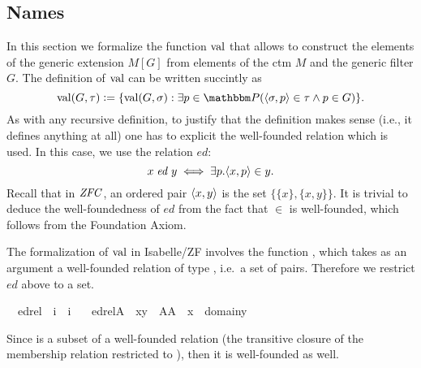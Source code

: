 \subsection{Names}
\label{sec:names}
In this section we formalize the function $\operatorname{val}$ that allows to
construct the elements of the generic extension $M[G]$ from elements
of the ctm $M$ and the generic filter $G$. The definition of $\operatorname{val}$
can be written succintly as
%
\begin{equation}\label{eq:def-val}
\val(G,\tau)\defi \{\val(G,\sigma) : \exists p\in \PP
(\lb\sigma,p\rb\in\tau \y p\in G)\}.
\end{equation}
%
As with any recursive definition, to justify that the definition makes
sense (i.e., it defines anything at all) one has to explicit the
well-founded relation which is used. In this case, we use the relation
$\mathit{ed}$:
\[
x \mathrel{\mathit{ed}} y \iff \exists p . \langle x,p\rangle\in y.
\]
Recall that in $\mathit{ZFC}$, an ordered pair $\langle x,y \rangle$ is the set
$\{\{x\},\{x,y\}\}$. It is trivial to deduce the well-foundedness of
$\mathit{ed}$ from the fact that $\in$ is well-founded, which follows
from the Foundation Axiom.

The  formalization of $\operatorname{val}$ in Isabelle/ZF involves the function
, which takes as an argument a well-founded relation of
type , i.e.\ a set of pairs. Therefore we restrict
$\mathit{ed}$ above to a set.
%
\begin{isabelle}
\isamarkupfalse%
\isanewline
\ \ edrel\ {\isacharcolon}{\isacharcolon}\ {\isachardoublequoteopen}i\ {\isasymRightarrow}\ i{\isachardoublequoteclose}\ \isanewline
\ \ {\isachardoublequoteopen}edrel{\isacharparenleft}A{\isacharparenright}\ {\isacharequal}{\isacharequal}\ {\isacharbraceleft}{\isacharless}x{\isacharcomma}y{\isachargreater}\ {\isasymin}\ A{\isacharasterisk}A\ {\isachardot}\ x\ {\isasymin}\ domain{\isacharparenleft}y{\isacharparenright}{\isacharbraceright}{\isachardoublequoteclose}
\end{isabelle}
%
Since  is a subset of a  well-founded relation (the
transitive closure of the membership relation restricted to ),
then it is well-founded as well.

